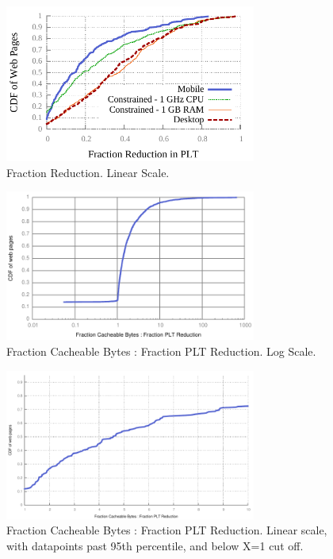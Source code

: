 \begin{figure}[t]
    \includegraphics[width=3.25in]{../graphs/percent_plt_reduction/percent_reduction_linear.pdf}
    \caption[]{\label{fig:percent_reduction_linear} Fraction Reduction. Linear Scale.}
\end{figure}

\begin{figure}[t]
    \includegraphics[width=3.25in]{../graphs/ratio_bytes_to_reduction/ratio.pdf}
    \caption[]{\label{fig:ratio} Fraction Cacheable Bytes : Fraction PLT
    Reduction. Log Scale.}
\end{figure}

\begin{figure}[t]
    \includegraphics[width=3.25in]{../graphs/ratio_bytes_to_reduction/ratio_linear.pdf}
    \caption[]{\label{fig:ratio_linear} Fraction Cacheable Bytes : Fraction PLT
    Reduction. Linear scale, with datapoints past 95th percentile, and below
    X=1 cut off.}
\end{figure}

